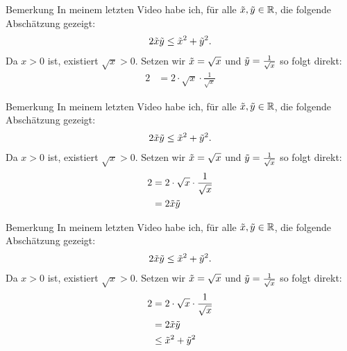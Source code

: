 \documentclass[10pt]{beamer}
\def\bR{\mathbb{R}}
\begin{document}
\begin{frame}{Bemerkung}
    In meinem letzten Video habe ich, für alle \( \Tilde{x}, \Tilde{y} \in \bR \), die folgende Abschätzung gezeigt:
    \begin{align*}
        2\Tilde{x}\Tilde{y}
        \leq \Tilde{x}^{2} + \Tilde{y}^{2}.
    \end{align*}
    Da \( x > 0 \) ist, existiert \( \sqrt{x} > 0 \). Setzen wir \( \Tilde{x} = \sqrt{x} \) und \( \Tilde{y} = \frac{1}{\sqrt{x}} \) so folgt direkt:
    \begin{align*}
        2
        & = 2 \cdot \sqrt{x} \cdot \frac{1}{\sqrt{x}}
    \end{align*}
\end{frame}



\begin{frame}{Bemerkung}
    In meinem letzten Video habe ich, für alle \( \Tilde{x}, \Tilde{y} \in \bR \), die folgende Abschätzung gezeigt:
    \begin{align*}
        2\Tilde{x}\Tilde{y}
        \leq \Tilde{x}^{2} + \Tilde{y}^{2}.
    \end{align*}
    Da \( x > 0 \) ist, existiert \( \sqrt{x} > 0 \). Setzen wir \( \Tilde{x} = \sqrt{x} \) und \( \Tilde{y} = \frac{1}{\sqrt{x}} \) so folgt direkt:
    \begin{align*}
        2
        & = 2 \cdot \sqrt{x} \cdot \frac{1}{\sqrt{x}} \\
        & = 2\Tilde{x}\Tilde{y}
    \end{align*}
\end{frame}



\begin{frame}{Bemerkung}
    In meinem letzten Video habe ich, für alle \( \Tilde{x}, \Tilde{y} \in \bR \), die folgende Abschätzung gezeigt:
    \begin{align*}
        2\Tilde{x}\Tilde{y}
        \leq \Tilde{x}^{2} + \Tilde{y}^{2}.
    \end{align*}
    Da \( x > 0 \) ist, existiert \( \sqrt{x} > 0 \). Setzen wir \( \Tilde{x} = \sqrt{x} \) und \( \Tilde{y} = \frac{1}{\sqrt{x}} \) so folgt direkt:
    \begin{align*}
        2
        & = 2 \cdot \sqrt{x} \cdot \frac{1}{\sqrt{x}} \\
        & = 2\Tilde{x}\Tilde{y} \\
        & \leq \Tilde{x}^{2} + \Tilde{y}^{2}
    \end{align*}
\end{frame}
\end{document}
